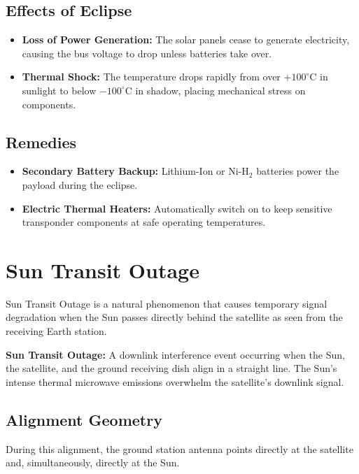 \documentclass[12pt,a4paper]{article}
\begin{document}
\subsection{Effects of Eclipse}
\begin{itemize}[leftmargin=*, itemsep=2.5pt]
  \item \textbf{Loss of Power Generation:} The solar panels cease to generate electricity, causing the bus voltage to drop unless batteries take over.
  \item \textbf{Thermal Shock:} The temperature drops rapidly from over $+100^\circ\text{C}$ in sunlight to below $-100^\circ\text{C}$ in shadow, placing mechanical stress on components.
\end{itemize}

\subsection{Remedies}
\begin{itemize}[leftmargin=*, itemsep=2.5pt]
  \item \textbf{Secondary Battery Backup:} Lithium-Ion or $\text{Ni-H}_2$ batteries power the payload during the eclipse.
  \item \textbf{Electric Thermal Heaters:} Automatically switch on to keep sensitive transponder components at safe operating temperatures.
\end{itemize}

\section{Sun Transit Outage}

Sun Transit Outage is a natural phenomenon that causes temporary signal degradation when the Sun passes directly behind the satellite as seen from the receiving Earth station.

\begin{tcolorbox}[defbox]
\textbf{Sun Transit Outage:} A downlink interference event occurring when the Sun, the satellite, and the ground receiving dish align in a straight line. The Sun's intense thermal microwave emissions overwhelm the satellite's downlink signal.
\end{tcolorbox}

\subsection{Alignment Geometry}
During this alignment, the ground station antenna points directly at the satellite and, simultaneously, directly at the Sun.
\end{document}
